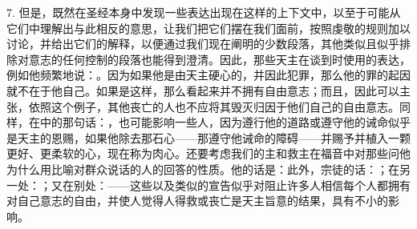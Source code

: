 7. 但是，既然在圣经本身中发现一些表达出现在这样的上下文中，以至于可能从它们中理解出与此相反的意思，让我们把它们摆在我们面前，按照虔敬的规则加以讨论，并给出它们的解释，以便通过我们现在阐明的少数段落，其他类似且似乎排除对意志的任何控制的段落也能得到澄清。因此，那些天主在谈到时使用的表达，例如他频繁地说：。因为如果他是由天主硬心的，并因此犯罪，那么他的罪的起因就不在于他自己。如果是这样，那么看起来并不拥有自由意志；而且，因此可以主张，依照这个例子，其他丧亡的人也不应将其毁灭归因于他们自己的自由意志。同样，在中的那句话：，也可能影响一些人，因为遵行他的道路或遵守他的诫命似乎是天主的恩赐，如果他除去那石心——那遵守他诫命的障碍——并赐予并植入一颗更好、更柔软的心，现在称为肉心。还要考虑我们的主和救主在福音中对那些问他为什么用比喻对群众说话的人的回答的性质。他的话是：此外，宗徒的话：；在另一处：；又在别处：——这些以及类似的宣告似乎对阻止许多人相信每个人都拥有对自己意志的自由，并使人觉得人得救或丧亡是天主旨意的结果，具有不小的影响。\par

